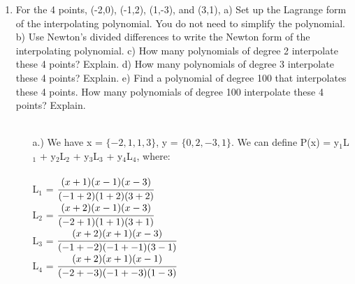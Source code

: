 \documentclass[12pt]{article}
\begin{document}
\begin{enumerate}
	\item For the 4 points, (-2,0), (-1,2), (1,-3), and (3,1), a) Set up the Lagrange form of the interpolating polynomial. You do not need to simplify the
polynomial. b) Use Newton’s divided differences to write the Newton form of the interpolating polynomial. c) How many polynomials of degree 2 interpolate these 4 points? Explain. d) How many polynomials of degree 3 interpolate these 4 points? Explain. e) Find a polynomial of degree 100 that interpolates these 4 points. How many polynomials of
degree 100 interpolate these 4 points? Explain. \\ \\

	\begin{itemize}
		\item[a.)] 	We have x = $\{-2, 1, 1, 3\}$, y = $\{0,2,-3,1\}$. We can define P(x) = y$_1$L$_1$ + y$_2$L$_2$ + y$_3$L$_3$ + y$_4$L$_4$, where: \\ \\
		L$_1$ = $\cfrac{(x+1)(x-1)(x-3)}{(-1+2)(1+2)(3+2)}$ \\
		L$_2$ = $\cfrac{(x+2)(x-1)(x-3)}{(-2+1)(1+1)(3+1)}$ \\
		L$_3$ = $\cfrac{(x+2)(x+1)(x-3)}{(-1+-2)(-1+-1)(3-1)}$ \\
		L$_4$ = $\cfrac{(x+2)(x+1)(x-1)}{(-2+-3)(-1+-3)(1-3)}$ \\ \\
		

\end{itemize}
\end{enumerate}
\end{document}
